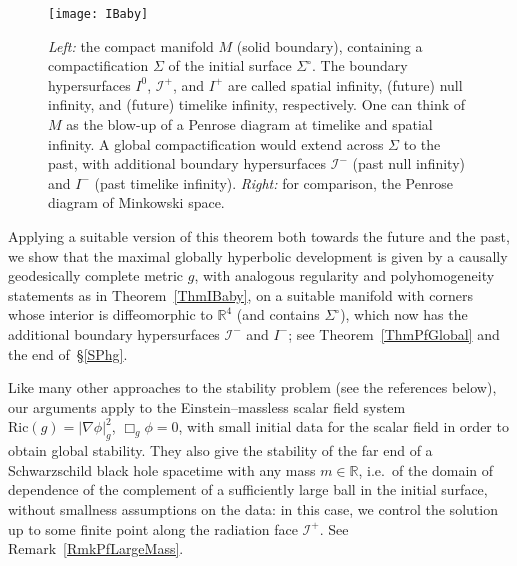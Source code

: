 \documentclass[reqno,11pt,letterpaper]{amsart}
\numberwithin{equation}{section}
\numberwithin{figure}{section}
\theoremstyle{definition}
\theoremstyle{remark}
\newcommand{\ms}{\mathscr}
\newcommand{\scri}{\ms I}
\newcommand{\R}{\mathbb{R}}
\newcommand{\Ric}{\mathrm{Ric}}
\begin{document}
\begin{figure}[!ht]
\texttt{[image: IBaby]}
\caption{\textit{Left:} the compact manifold $M$ (solid boundary), containing a compactification $\Sigma$ of the initial surface $\Sigma^\circ$. The boundary hypersurfaces $I^0$, $\scri^+$, and $I^+$ are called spatial infinity, (future) null infinity, and (future) timelike infinity, respectively. One can think of $M$ as the blow-up of a Penrose diagram at timelike and spatial infinity. A global compactification would extend across $\Sigma$ to the past, with additional boundary hypersurfaces $\scri^-$ (past null infinity) and $I^-$ (past timelike infinity). \textit{Right:} for comparison, the Penrose diagram of Minkowski space.}
\label{FigIBaby}
\end{figure}

Applying a suitable version of this theorem both towards the future and the past, we show that the maximal globally hyperbolic development is given by a causally geodesically complete metric $g$, with analogous regularity and polyhomogeneity statements as in Theorem~\ref{ThmIBaby}, on a suitable manifold with corners whose interior is diffeomorphic to $\R^4$ (and contains $\Sigma^\circ$), which now has the additional boundary hypersurfaces $\scri^-$ and $I^-$; see Theorem~\ref{ThmPfGlobal} and the end of~\S\ref{SPhg}.

Like many other approaches to the stability problem (see the references below), our arguments apply to the Einstein--massless scalar field system $\Ric(g)=|\nabla\phi|_g^2$, $\Box_g\phi=0$, with small initial data for the scalar field in order to obtain global stability. They also give the stability of the far end of a Schwarzschild black hole spacetime with any mass $m\in\R$, i.e.\ of the domain of dependence of the complement of a sufficiently large ball in the initial surface, without smallness assumptions on the data: in this case, we control the solution up to some finite point along the radiation face $\scri^+$. See Remark~\ref{RmkPfLargeMass}.
\end{document}
